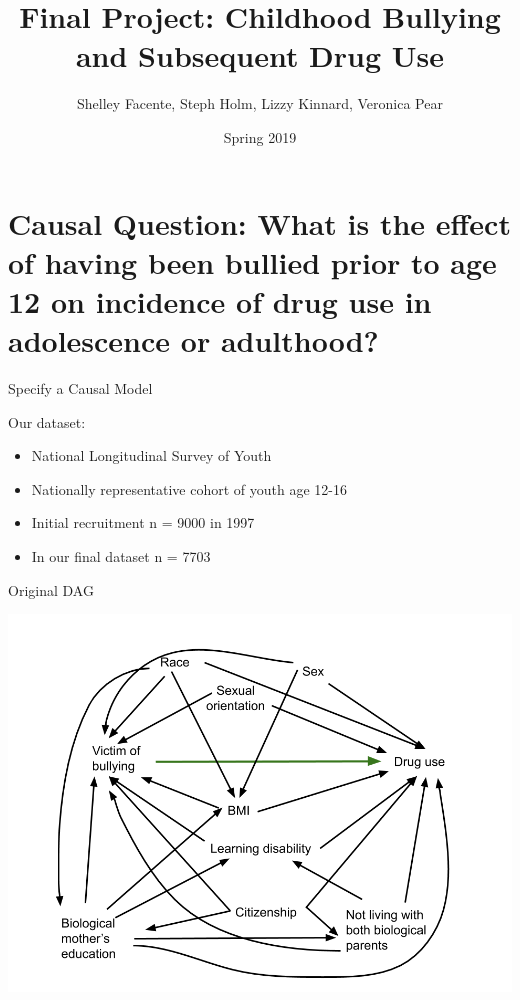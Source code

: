 \documentclass[ignorenonframetext,]{beamer}
\title{Final Project: Childhood Bullying and Subsequent Drug Use}
\author{Shelley Facente, Steph Holm, Lizzy Kinnard, Veronica Pear}
\date{Spring 2019}
\providecommand{\tightlist}{%
  \setlength{\itemsep}{0pt}\setlength{\parskip}{0pt}}
\begin{document}
\frame{\titlepage}

\section{Causal Question: What is the effect of having been bullied
prior to age 12 on incidence of drug use in adolescence or
adulthood?}\label{causal-question-what-is-the-effect-of-having-been-bullied-prior-to-age-12-on-incidence-of-drug-use-in-adolescence-or-adulthood}

\begin{frame}{Specify a Causal Model}

Our dataset:

\begin{itemize}
\tightlist
\item
  National Longitudinal Survey of Youth
\item
  Nationally representative cohort of youth age 12-16
\item
  Initial recruitment n = 9000 in 1997
\item
  In our final dataset n = 7703
\end{itemize}

\end{frame}

\begin{frame}{Original DAG}

\includegraphics[width=1\linewidth]{DAG Causal Final Project_all covariates}

\end{frame}
\end{document}
